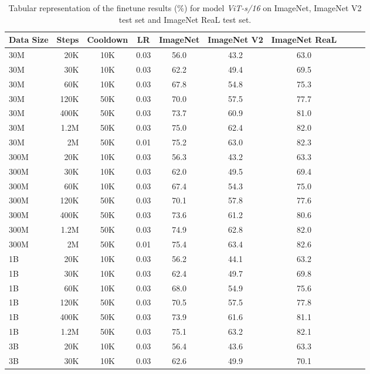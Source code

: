 \begin{table}[h]
  \setlength{\tabcolsep}{5pt}
  \setlength{\extrarowheight}{5pt}
  \renewcommand{\arraystretch}{0.75}
  \centering
  \caption{Tabular representation of the finetune results (\%) for model \emph{ViT-s/16} on ImageNet, ImageNet V2 test set and ImageNet ReaL test set.}\label{tbl:xs_16_ft}
  \begin{tabulary}{1.0\textwidth}{l r c c c c c c c c}
    \toprule[1pt]
    \bf{Data Size} & \bf{Steps} & \bf{Cooldown} & \bf{LR} & \bf{ImageNet} & \bf{ImageNet V2} & \bf{ImageNet ReaL} \\
    \midrule
30M   & 20K   & 10K   & 0.03 & 56.0 & 43.2 & 63.0 \\
30M   & 30K   & 10K   & 0.03 & 62.2 & 49.4 & 69.5 \\
30M   & 60K   & 10K   & 0.03 & 67.8 & 54.8 & 75.3 \\
30M   & 120K  & 50K   & 0.03 & 70.0 & 57.5 & 77.7 \\
30M   & 400K  & 50K   & 0.03 & 73.7 & 60.9 & 81.0 \\
30M   & 1.2M  & 50K   & 0.03 & 75.0 & 62.4 & 82.0 \\
30M   & 2M    & 50K   & 0.01 & 75.2 & 63.0 & 82.3 \\
\midrule[0.25pt]
300M  & 20K   & 10K   & 0.03 & 56.3 & 43.2 & 63.3 \\
300M  & 30K   & 10K   & 0.03 & 62.0 & 49.5 & 69.4 \\
300M  & 60K   & 10K   & 0.03 & 67.4 & 54.3 & 75.0 \\
300M  & 120K  & 50K   & 0.03 & 70.1 & 57.8 & 77.6 \\
300M  & 400K  & 50K   & 0.03 & 73.6 & 61.2 & 80.6 \\
300M  & 1.2M  & 50K   & 0.03 & 74.9 & 62.8 & 82.0 \\
300M  & 2M    & 50K   & 0.01 & 75.4 & 63.4 & 82.6 \\
\midrule[0.25pt]
1B    & 20K   & 10K   & 0.03 & 56.2 & 44.1 & 63.2 \\
1B    & 30K   & 10K   & 0.03 & 62.4 & 49.7 & 69.8 \\
1B    & 60K   & 10K   & 0.03 & 68.0 & 54.9 & 75.6 \\
1B    & 120K  & 50K   & 0.03 & 70.5 & 57.5 & 77.8 \\
1B    & 400K  & 50K   & 0.03 & 73.9 & 61.6 & 81.1 \\
1B    & 1.2M  & 50K   & 0.03 & 75.1 & 63.2 & 82.1 \\
\midrule[0.25pt]
3B    & 20K   & 10K   & 0.03 & 56.4 & 43.6 & 63.3 \\
3B    & 30K   & 10K   & 0.03 & 62.6 & 49.9 & 70.1 \\
    \bottomrule
  \end{tabulary}
\end{table}



